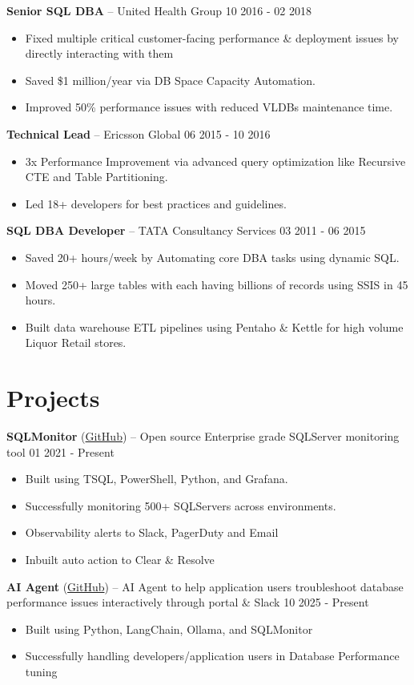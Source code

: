 \documentclass[10pt,a4paper]{article}
\begin{document}
\textbf{Senior SQL DBA} -- United Health Group \hfill 10 2016 - 02 2018
\begin{itemize}
  \item Fixed multiple critical customer-facing performance \& deployment issues by directly interacting with them
  \item Saved \$1 million/year via DB Space Capacity Automation.
  \item Improved 50\% performance issues with reduced VLDBs maintenance time.
\end{itemize}

\textbf{Technical Lead} -- Ericsson Global \hfill 06 2015 - 10 2016
\begin{itemize}
  \item 3x Performance Improvement via advanced query optimization like Recursive CTE and Table Partitioning.
  \item Led 18+ developers for best practices and guidelines.
\end{itemize}

\textbf{SQL DBA Developer} -- TATA Consultancy Services \hfill 03 2011 - 06 2015
\begin{itemize}
  \item Saved 20+ hours/week by Automating core DBA tasks using dynamic SQL.
  \item Moved 250+ large tables with each having billions of records using SSIS in 45 hours.
  \item Built data warehouse ETL pipelines using Pentaho \& Kettle for high volume Liquor Retail stores.
\end{itemize}

\section{Projects}
\textbf{SQLMonitor} (\href{https://github.com/imajaydwivedi/SQLMonitor}{GitHub}) -- Open source Enterprise grade SQLServer monitoring tool \hfill 01 2021 - Present
\begin{itemize}
\item Built using TSQL, PowerShell, Python, and Grafana.
\item Successfully monitoring 500+ SQLServers across environments.
\item Observability alerts to Slack, PagerDuty and Email
\item Inbuilt auto action to Clear \& Resolve
\end{itemize}

\textbf{AI Agent} (\href{https://github.com/imajaydwivedi/SQLMonitor/tree/dev/AI-Agent}{GitHub}) -- AI Agent to help application users troubleshoot database performance issues interactively through portal \& Slack \hfill 10 2025 - Present
\begin{itemize}
\item Built using Python, LangChain, Ollama, and SQLMonitor
\item Successfully handling developers/application users in Database Performance tuning
\end{itemize}
\end{document}
